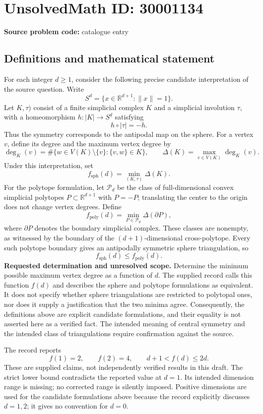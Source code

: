 \documentclass[11pt]{article}
\newcommand{\R}{\mathbb{R}}
\begin{document}
\section*{UnsolvedMath ID: 30001134}
\textbf{Source problem code:} catalogue entry
\subsection{Definitions and mathematical statement}
For each integer \(d\geq 1\), consider the following precise candidate interpretation of the source question. Write
\[
S^d=\{x\in\R^{d+1}:\|x\|=1\}.
\]
Let \(K,\tau)\) consist of a finite simplicial complex \(K\) and a simplicial involution \(\tau\), with a homeomorphism \(h:|K|\to S^d\) satisfying
\[
h\circ|\tau|=-h.
\]
Thus the symmetry corresponds to the antipodal map on the sphere. For a vertex \(v\), define its degree and the maximum vertex degree by
\[
\deg_K(v)=\#\{w\in V(K)\setminus\{v\}:\{v,w\}\in K\},
\qquad
\Delta(K)=\max_{v\in V(K)}\deg_K(v).
\]
Under this interpretation, set
\[
f_{\mathrm{sph}}(d)=\min_{(K,\tau)}\Delta(K).
\]
For the polytope formulation, let \(\mathcal P_d\) be the class of full-dimensional convex simplicial polytopes \(P\subset\R^{d+1}\) with \(P=-P\); translating the center to the origin does not change vertex degrees. Define
\[
f_{\mathrm{poly}}(d)=\min_{P\in\mathcal P_d}\Delta(\partial P),
\]
where \(\partial P\) denotes the boundary simplicial complex. These classes are nonempty, as witnessed by the boundary of the \((d+1)\)-dimensional cross-polytope. Every such polytope boundary gives an antipodally symmetric sphere triangulation, so
\[
f_{\mathrm{sph}}(d)\leq f_{\mathrm{poly}}(d).
\]
\textbf{Requested determination and unresolved scope.} Determine the minimum possible maximum vertex degree as a function of \(d\). The supplied record calls this function \(f(d)\) and describes the sphere and polytope formulations as equivalent. It does not specify whether sphere triangulations are restricted to polytopal ones, nor does it supply a justification that the two minima agree. Consequently, the definitions above are explicit candidate formulations, and their equality is not asserted here as a verified fact. The intended meaning of central symmetry and the intended class of triangulations require confirmation against the source.

The record reports
\[
f(1)=2,\qquad f(2)=4,\qquad d+1<f(d)\leq 2d.
\]
These are supplied claims, not independently verified results in this draft. The strict lower bound contradicts the reported value at \(d=1\). Its intended dimension range is missing; no corrected range is silently imposed. Positive dimensions are used for the candidate formulations above because the record explicitly discusses \(d=1,2\); it gives no convention for \(d=0\).
\end{document}
